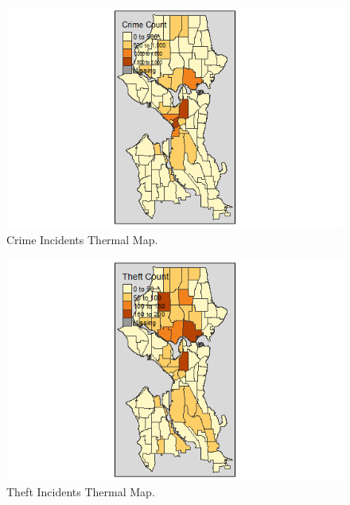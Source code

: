 \documentclass[a4paper]{article}
\begin{document}
\begin{figure}
\centering
\includegraphics[width=1\textwidth]{crimeMap_s.png}
\caption{\label{fig:crimeThermal}Crime Incidents Thermal Map.}
\end{figure} 

\begin{figure}
\centering
\includegraphics[width=1\textwidth]{theftCount.png}
\caption{\label{fig:theftThermal}Theft Incidents Thermal Map.}
\end{figure} 


%
%
\end{document}

